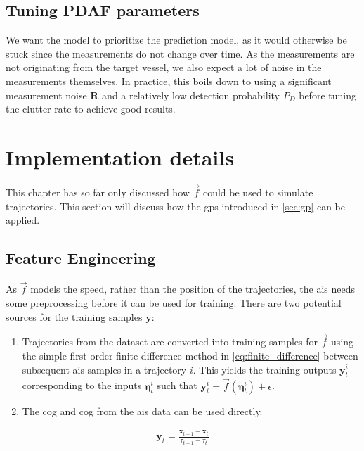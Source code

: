 \subsection{Tuning PDAF parameters}
We want the model to prioritize the prediction model, as it would otherwise be stuck since the measurements do not change over time. As the measurements are not originating from the target vessel, we also expect a lot of noise in the measurements themselves. In practice, this boils down to using a significant measurement noise $\boldsymbol{R}$ and a relatively low detection probability $P_D$ before tuning the clutter rate to achieve good results.

\section{Implementation details}
This chapter has so far only discussed how $\vec{f}$ could be used to simulate trajectories. This section will discuss how the \acrshort{gp}s introduced in \cref{sec:gp} can be applied.

\subsection{Feature Engineering}
As $\vec{f}$ models the speed, rather than the position of the trajectories, the \acrshort{ais} needs some preprocessing before it can be used for training. There are two potential sources for the training samples $\boldsymbol{y}$:

\begin{enumerate}
    \item Trajectories from the dataset are converted into training samples for $\vec{f}$ using the simple first-order finite-difference method in \cref{eq:finite_difference} between subsequent \acrshort{ais} samples in a trajectory $i$. This yields the training outputs $\boldsymbol{y}_t^{i}$ corresponding to the inputs $\boldsymbol{\eta}_t^i$ such that $\boldsymbol{y}_t^i = \vec{f}(\boldsymbol{\eta}_t^i) + \epsilon$.
    \item The \acrshort{cog} and \acrshort{cog} from the \acrshort{ais} data can be used directly.
\end{enumerate}

\begin{align}\label{eq:finite_difference}
\boldsymbol{y}_t = \frac{\boldsymbol{x}_{t+1} - \boldsymbol{x}_t}{\tau_{t+1} - \tau_t}
\end{align}


